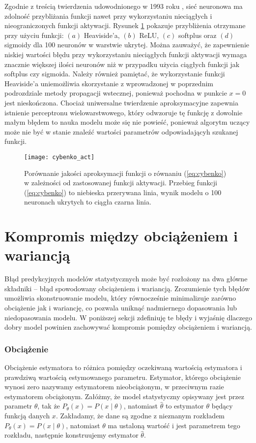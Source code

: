 \documentclass[11pt]{book}
\theoremstyle{definition}
\begin{document}
Zgodnie z treścią twierdzenia udowodnionego w 1993 roku \cite{Leshno1993MultilayerFN}, sieć neuronowa ma zdolność przybliżania funkcji nawet przy wykorzystaniu nieciągłych i nieograniczonych funkcji aktywacji. Rysunek \ref{fig:cybenko3} pokazuje przybliżenia otrzymane przy użyciu funkcji: $(a)$ Heaviside'a, $(b)$ ReLU, $(c)$ softplus oraz $(d)$ sigmoidy dla 100 neuronów w warstwie ukrytej. Można zauważyć, że zapewnienie niskiej wartości błędu przy wykorzystaniu nieciągłych funkcji aktywacji wymaga znacznie większej ilości neuronów niż w przypadku użycia ciągłych funkcji jak softplus czy sigmoida. Należy również pamiętać, że wykorzystanie funkcji Heaviside'a uniemożliwia skorzystanie z wprowadzonej w poprzednim podrozdziale metody propagacji wstecznej, ponieważ pochodna w punkcie $x=0$ jest nieskończona. Chociaż uniwersalne twierdzenie aproksymacyjne zapewnia istnienie perceptronu wielowarstwowego, który odwzoruje tę funkcję z dowolnie małym błędem to nauka modelu może się nie powieść, ponieważ algorytm uczący może nie być w stanie znaleźć wartości parametrów odpowiadającyh szukanej funkcji. 
%	
\begin{figure}[h!]
	\centering
	\texttt{[image: cybenko\_act]}
	\caption{Porównanie jakości aproksymacji funkcji o równaniu (\ref{eq:cybenko}) w zależności od zastosowanej funkcji aktywacji. Przebieg funkcji (\ref{eq:cybenko}) to niebieska przerywana linia, wynik modelu o 100 neuronach ukrytych to ciągła czarna linia.}
		 \label{fig:cybenko3}
\end{figure}

\section{Kompromis między obciążeniem i wariancją}


Błąd predykcyjnych modelów statystycznych może być rozłożony na dwa główne składniki -- błąd spowodowany obciążeniem i wariancją. Zrozumienie tych błędów umożliwia skonstruowanie modelu, który równocześnie minimalizuje zarówno obciążenie jak i wariancję, co pozwala uniknąć nadmiernego dopasowania lub niedopasowania modelu. W poniższej sekcji zdefiniuję te błędy i wyjaśnię dlaczego dobry model powinien zachowywać kompromis pomiędzy obciążeniem i wariancją.


\subsubsection{Obciążenie}
Obciążenie estymatora to różnica pomiędzy oczekiwaną wartością estymatora i prawdziwą wartością estymowanego parametru. Estymator, którego obciążenie wynosi zero nazywamy estymatorem nieobciążonym, w przeciwnym razie estymatorem obciążonym. Załóżmy, że model statystyczny opisywany jest przez parametr $\theta$, tak że $P_{\theta }(x)=P(x\mid \theta)$, natomiast $\hat{\theta}$ to estymator $\theta$ będący funkcją danych $x$. Zakładamy, że dane są zgodne z nieznanym rozkładem $P_{\theta }(x)=P(x\mid \theta)$, natomiast $\theta$ ma ustaloną wartość i jest parametrem tego rozkładu, następnie konstruujemy estymator $\hat{\theta}$.
\end{document}
